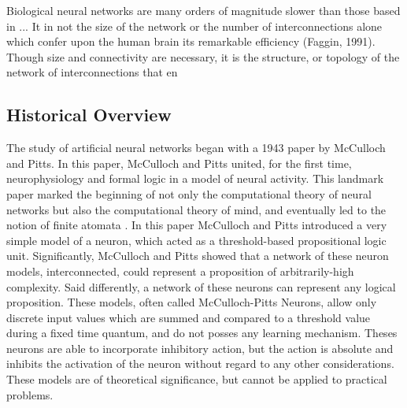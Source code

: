 \documentclass[11pt]{afthesis}
\begin{document}
	Biological neural networks are many orders of magnitude slower than those based in ... It in not the size of the network or the number of interconnections alone which confer upon the human brain its remarkable efficiency (Faggin, 1991). Though size and connectivity are necessary, it is the structure, or topology of the network of interconnections that en
	
	
	
	
	
	\subsection{Historical Overview}
	
	The study of artificial neural networks began with a 1943 paper \cite{mcculloch1988} by McCulloch and Pitts. In this paper, McCulloch and Pitts united, for the first time, neurophysiology and formal logic in a model of neural activity. This landmark paper marked the beginning of not only the computational theory of neural networks but also the computational theory of mind, and eventually led to the notion of finite atomata \cite{piccinini2006}. In this paper McCulloch and Pitts introduced a very simple model of a neuron, which acted as a threshold-based propositional logic unit. Significantly, McCulloch and Pitts showed that a network of these neuron models, interconnected, could represent a proposition of arbitrarily-high complexity. Said differently, a network of these neurons can represent any logical proposition. These models, often called McCulloch-Pitts Neurons, allow only discrete input values which are summed and compared to a threshold value during a fixed time quantum, and do not posses any learning mechanism. Theses neurons are able to incorporate inhibitory action, but the action is absolute and inhibits the activation of the neuron without regard to any other considerations. These models are of theoretical significance, but cannot be applied to practical problems.
	
\end{document}
